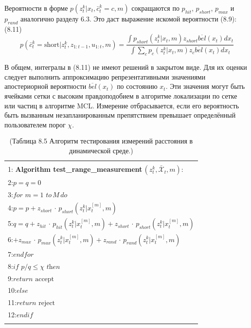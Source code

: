\documentclass[10pt,a4paper]{article}
\begin{document}
Вероятности в форме $p(z_t^k|x_t,\bar{c}_t^k=c,m)$ сокращаются по $p_{hit}$, $p_{short}$, $p_{max}$ и $p_{rand}$ аналогично разделу 6.3. Это даст выражение искомой вероятности (8.9):\\

(8.11)
$$p(\bar{c}_t^k=\text{short}|z_t^k,z_{1:t-1},u_{1:t},m)=\frac{\int p_{short}(z_t^k|x_t,m)z_{short}\overline{bel}(x_t)dx_t}{\int\sum_c p_c(z_t^k|x_t,m)z_c\overline{bel}(x_t)dx_t} $$
 
В общем, интегралы в (8.11) не имеют решений в закрытом виде. Для их оценки следует выполнить аппроксимацию репрезентативными значениями апостериорной вероятности $\overline{bel}(x_t)$ по состоянию $x_t$. Эти значения могут быть ячейками сетки с высоким правдоподобием в алгоритме локализации по сетке или частиц в алгоритме MCL. Измерение отбрасывается, если его вероятность быть вызванным незапланированным препятствием превышает определённый пользователем порог $\chi$. 
 
\begin{table}[H]
\begin{center}
\begin{tabular}{|l|}
\hline
{}\\
1: \textbf{Algorithm test\_range\_measurement}$\,(z_t^k,\bar{\mathcal{X}}_t,m):$ \\
2:\hspace{5mm}$p=q=0$\\
3:\hspace{5mm}$\textit{for}\,\,m=1\,\,\textit{to}\,M\,\textit{do}$\\
4:\hspace{10mm}$p=p+z_{short}\,\cdot\,p_{short}(z_t^k|x_t^{[m]},m)$\\
5:\hspace{10mm}$q=q+z_{hit}\,\cdot\,p_{hit}(z_t^k|x_t^{[m]},m)+z_{short}\,\cdot\,p_{short}(z_t^k|x_t^{[m]},m)$\\
6:\hspace{15mm}$+z_{max}\,\cdot\,p_{max}(z_t^k|x_t^{[m]},m)+z_{rand}\,\cdot\,p_{rand}(z_t^k|x_t^{[m]},m)$\\
7:\hspace{5mm}$\textit{endfor}$\\
8:\hspace{5mm}$\textit{if}\,\,p/q\leq\chi\,\,\textit{then}$\\
9:\hspace{10mm}$\textit{return}\,\,\text{accept}$\\
10:\hspace{4mm}$\textit{else}$\\
11:\hspace{9mm}$\textit{return}\,\,\text{reject}$\\
12:\hspace{4mm}$\textit{endif}$\\
{}\\
\hline
\end{tabular}
\caption{(Таблица 8.5   Алгоритм тестирования измерений расстояния в динамической среде.)}
\end{center}
\end{table} 
 
\end{document}
